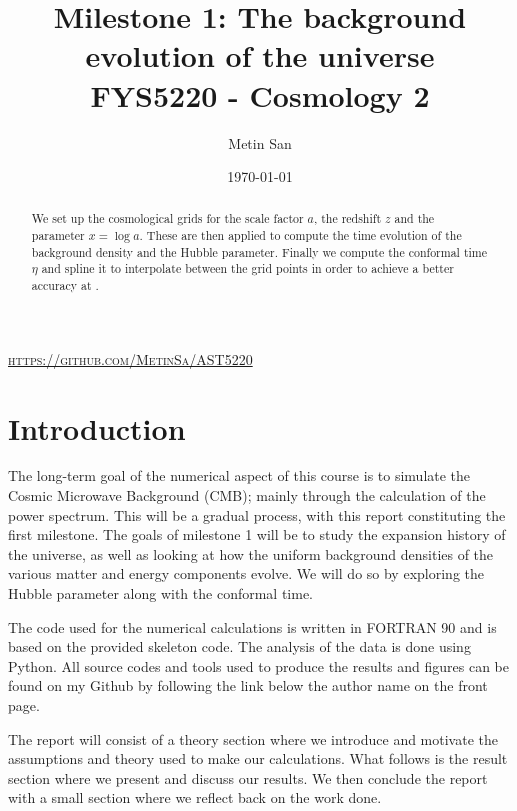 \documentclass[a4paper, 10pt, reqno]{amsart}
\title[Milestone 1]{\Large{Milestone 1: The background evolution of the universe} \\
\normalsize{FYS5220 - Cosmology 2}}
\author[San]{Metin San}
\date{\today}
\begin{document}
\maketitle
\begin{center}
   \vspace*{-0.6cm} \textsc{\url{https://github.com/MetinSa/AST5220}}
\end{center}

\begin{abstract}
    We set up the cosmological grids for the scale factor $a$, the
    redshift $z$ and the parameter $x = \log a$. These are then applied
    to compute the time evolution of the background density and the
    Hubble parameter. Finally we compute the conformal time $\eta$ and
    spline it to interpolate between the grid points in order to
    achieve a better accuracy at .
\end{abstract}

\section{Introduction}
The long-term goal of the numerical aspect of this course is to
simulate the Cosmic Microwave Background (CMB); mainly through the
calculation of the power spectrum. This will be a gradual process, with
this report constituting the first milestone. The goals of milestone 1
will be to study the expansion history of the universe, as well as
looking at how the uniform background densities of the various matter
and energy components evolve. We will do so by exploring the Hubble
parameter along with the conformal time.

The code used for the numerical calculations is written in FORTRAN 90
and is based on the provided skeleton code. The analysis of the data is
done using Python. All source codes and tools used to produce the
results and figures can be found on my Github by following the link
below the author name on the front page.

The report will consist of a theory section where we introduce and
motivate the assumptions and theory used to make our calculations. What
follows is the result section where we present and discuss our results.
We then conclude the report with a small section where we reflect back
on the work done.
\end{document}
